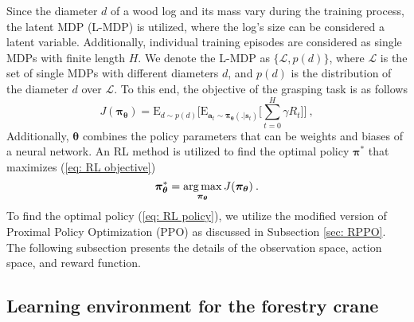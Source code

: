 Since the diameter $d$ of a wood log and its mass vary during the training process, the latent MDP (L-MDP) is utilized, where the log's size can be considered a latent variable. Additionally, individual training episodes are considered as single MDPs with finite length $H$. We denote the L-MDP as $\{\mathcal{L}, p(d)\}$, where $\mathcal{L}$ is the set of single MDPs with different diameters $d$, and $p(d)$ is the  distribution of the diameter $d$ over $\mathcal{L}$. To this end, the objective of the grasping task is as follows
\begin{equation}
    J(\bm{\pi_\theta}) = \mathrm{E}_{d\sim p(d)}\bigg[\mathrm{E}_{\mathbf{a}_t\sim \bm{\pi_\theta}(.|\mathbf{s}_t)} \Bigg[\sum_{t=0}^{H}\gamma R_t\Bigg] \bigg]\:,
    \label{eq: RL objective}
\end{equation}
Additionally, $\bm{\theta}$ combines the policy parameters that can be weights and biases of a neural network. 
An RL method is utilized to find the optimal policy $\bm{\pi}^*$ that maximizes (\ref{eq: RL objective}) 
\begin{equation}
    \bm{\pi_\theta}^* = \operatorname*{arg\,max}_{\bm{\pi_\theta}} J(\bm{\pi_\theta}) \:.
    \label{eq: RL policy}
\end{equation}
To find the optimal policy (\ref{eq: RL policy}), we utilize the modified version of Proximal Policy Optimization (PPO) as discussed in Subsection \ref{sec: RPPO}. The following subsection presents the details of the observation space, action space, and reward function. 
\subsection{Learning environment for the forestry crane}
